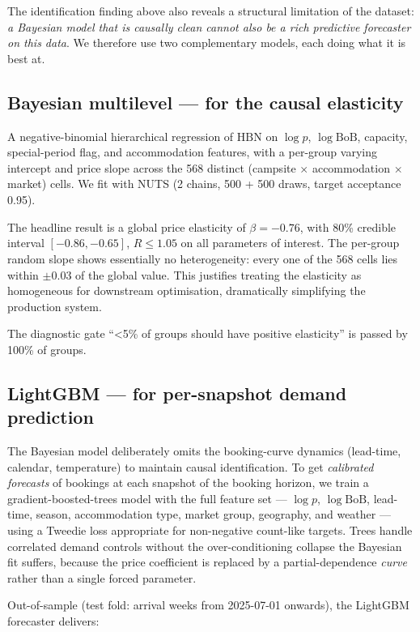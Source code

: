 \documentclass[11pt,a4paper]{article}
\begin{document}
The identification finding above also reveals a structural limitation of the dataset: \emph{a Bayesian model that is causally clean cannot also be a rich predictive forecaster on this data}. We therefore use two complementary models, each doing what it is best at.

\subsection{Bayesian multilevel — for the causal elasticity}

A negative-binomial hierarchical regression of $\mathrm{HBN}$ on $\log p$, $\log\mathrm{BoB}$, capacity, special-period flag, and accommodation features, with a per-group varying intercept and price slope across the 568 distinct (campsite $\times$ accommodation $\times$ market) cells. We fit with NUTS (2 chains, 500 + 500 draws, target acceptance 0.95).

The headline result is a global price elasticity of \textbf{$\beta = -0.76$}, with 80\% credible interval $[-0.86, -0.65]$, $\hat R \le 1.05$ on all parameters of interest. The per-group random slope shows essentially no heterogeneity: every one of the 568 cells lies within $\pm 0.03$ of the global value. This justifies treating the elasticity as homogeneous for downstream optimisation, dramatically simplifying the production system.

The diagnostic gate ``\textless 5\% of groups should have positive elasticity'' is passed by 100\% of groups.

\subsection{LightGBM — for per-snapshot demand prediction}

The Bayesian model deliberately omits the booking-curve dynamics (lead-time, calendar, temperature) to maintain causal identification. To get \emph{calibrated forecasts} of bookings at each snapshot of the booking horizon, we train a gradient-boosted-trees model with the full feature set --- $\log p$, $\log\mathrm{BoB}$, lead-time, season, accommodation type, market group, geography, and weather --- using a Tweedie loss appropriate for non-negative count-like targets. Trees handle correlated demand controls without the over-conditioning collapse the Bayesian fit suffers, because the price coefficient is replaced by a partial-dependence \emph{curve} rather than a single forced parameter.

Out-of-sample (test fold: arrival weeks from 2025-07-01 onwards), the LightGBM forecaster delivers:
\end{document}

